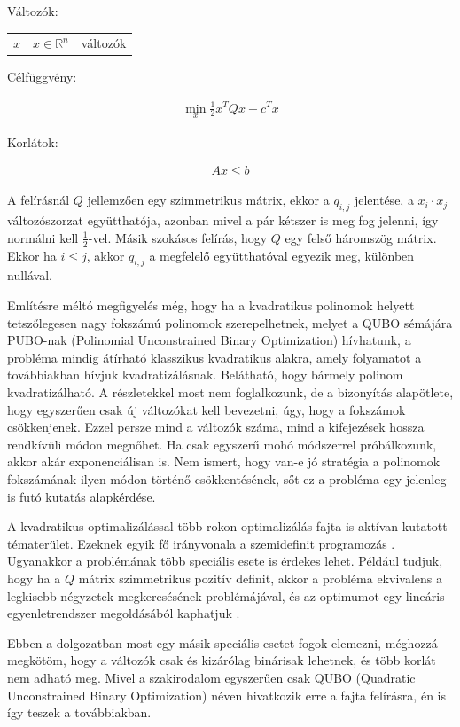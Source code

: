 Változók:

\begin{tabular}{lll}
	$x$ & $x \in \mathbb{R}^n$ & változók \\
\end{tabular}

Célfüggvény:

\begin{align}
	\min_{x} \frac{1}{2} x^T Q x + c^T x 
\end{align}

Korlátok:

\begin{align}
	Ax \leq b
\end{align}

A felírásnál $Q$ jellemzően egy szimmetrikus mátrix, ekkor a $q_{i,j}$ jelentése, a $x_i \cdot x_j$ változószorzat együtthatója, azonban mivel a pár kétszer is meg fog jelenni, így normálni kell $\frac{1}{2}$-vel. Másik szokásos felírás, hogy $Q$ egy felső háromszög mátrix. Ekkor ha $i \leq j$, akkor $q_{i,j}$ a megfelelő együtthatóval egyezik meg, különben nullával.

Említésre méltó megfigyelés még, hogy ha a kvadratikus polinomok helyett tetszőlegesen nagy fokszámú polinomok szerepelhetnek, melyet a QUBO sémájára PUBO-nak (Polinomial Unconstrained Binary Optimization) hívhatunk, a probléma mindig átírható klasszikus kvadratikus alakra, amely folyamatot a továbbiakban hívjuk kvadratizálásnak. Belátható, hogy bármely polinom kvadratizálható. A részletekkel most nem foglalkozunk, de a bizonyítás alapötlete, hogy egyszerűen csak új változókat kell bevezetni, úgy, hogy a fokszámok csökkenjenek. Ezzel persze mind a változók száma, mind a kifejezések hossza rendkívüli módon megnőhet. Ha csak egyszerű mohó módszerrel próbálkozunk, akkor akár exponenciálisan is. Nem ismert, hogy van-e jó stratégia a polinomok fokszámának ilyen módon történő csökkentésének, sőt ez a probléma egy jelenleg is futó kutatás alapkérdése.

A kvadratikus optimalizálással több rokon optimalizálás fajta is aktívan kutatott tématerület. Ezeknek egyik fő irányvonala a szemidefinit programozás \cite{Ramana1996}. Ugyanakkor a problémának több speciális esete is érdekes lehet. Például tudjuk, hogy ha a $Q$ mátrix szimmetrikus pozitív definit, akkor a probléma ekvivalens a legkisebb négyzetek megkeresésének problémájával, és az optimumot egy lineáris egyenletrendszer megoldásából kaphatjuk \cite{rozsa}.

Ebben a dolgozatban most egy másik speciális esetet fogok elemezni, méghozzá megkötöm, hogy a változók csak és kizárólag binárisak lehetnek, és több korlát nem adható meg. Mivel a szakirodalom egyszerűen csak QUBO (Quadratic Unconstrained Binary Optimization) néven hivatkozik erre a fajta felírásra\cite{enwiki:1020700695}\cite{DWaveOceanBQM}, én is így teszek a továbbiakban.

